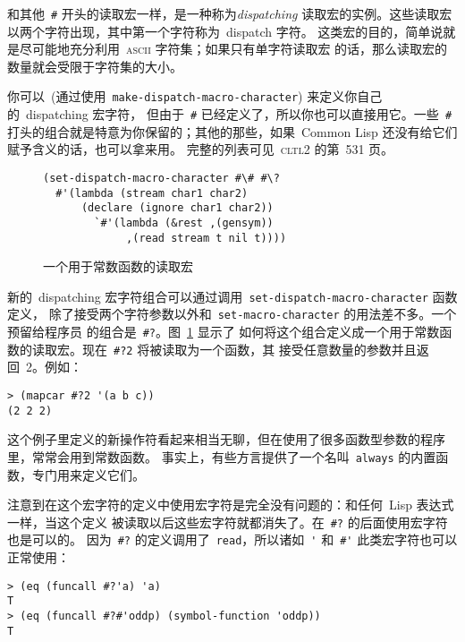 \sq 和其他~\verb|#| 开头的读取宏一样，是一种称为\emph{dispatching}
读取宏的实例。这些读取宏以两个字符出现，其中第一个字符称为~dispatch 字符。
这类宏的目的，简单说就是尽可能地充分利用~\textsc{ascii} 字符集；如果只有单字符读取宏
的话，那么读取宏的数量就会受限于字符集的大小。

你可以~(通过使用~\verb|make-dispatch-macro-character|) 来定义你自己的~dispatching 宏字符，
但由于~\verb|#| 已经定义了，所以你也可以直接用它。一些~\verb|#|
打头的组合就是特意为你保留的；其他的那些，如果~Common Lisp 还没有给它们赋予含义的话，也可以拿来用。
完整的列表可见~\textsc{cltl}2 的第~531 页。

\begin{figure}
\begin{lstlisting}
(set-dispatch-macro-character #\# #\?
  #'(lambda (stream char1 char2)
      (declare (ignore char1 char2))
        `#'(lambda (&rest ,(gensym))
             ,(read stream t nil t))))
\end{lstlisting}
  \caption{一个用于常数函数的读取宏}
  \label{fig:a_read-macro_for_constant_functions}
\end{figure}

新的~dispatching 宏字符组合可以通过调用~\verb|set-dispatch-macro-character| 函数定义，
除了接受两个字符参数以外和~\verb|set-macro-character| 的用法差不多。一个预留给程序员
的组合是~\verb|#?|。图~\ref{fig:a_read-macro_for_constant_functions} 显示了
如何将这个组合定义成一个用于常数函数的读取宏。现在~\verb|#?2| 将被读取为一个函数，其
接受任意数量的参数并且返回~2。例如：
\begin{lstlisting}
> (mapcar #?2 '(a b c))
(2 2 2)
\end{lstlisting}
这个例子里定义的新操作符看起来相当无聊，但在使用了很多函数型参数的程序里，常常会用到常数函数。
事实上，有些方言提供了一个名叫~\verb|always| 的内置函数，专门用来定义它们。

注意到在这个宏字符的定义中使用宏字符是完全没有问题的：和任何~Lisp 表达式一样，当这个定义
被读取以后这些宏字符就都消失了。在~\verb|#?| 的后面使用宏字符也是可以的。
因为~\verb|#?| 的定义调用了~\verb|read|，所以诸如~\verb|'| 和~\verb|#'|
此类宏字符也可以正常使用：
\begin{lstlisting}
> (eq (funcall #?'a) 'a)
T
> (eq (funcall #?#'oddp) (symbol-function 'oddp))
T
\end{lstlisting}

